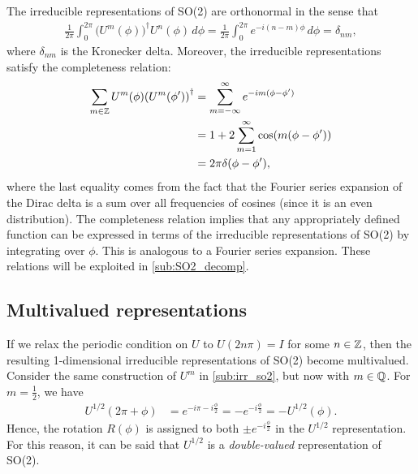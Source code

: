 The irreducible representations of SO(2) are orthonormal in the sense that
\begin{align}
    \frac{1}{2\pi}\int_{0}^{2\pi}{\bigl(U^m(\phi)\bigr)}^\dagger U^n(\phi) \,d\phi = \frac{1}{2\pi}\int_{0}^{2\pi} e^{-i(n-m)\phi} \,d\phi = \delta_{nm},\label{eq:orthogonality}
\end{align}
where $\delta_{nm}$ is the Kronecker delta.
Moreover, the irreducible representations satisfy the completeness relation:
\begin{align}
    \begin{split}    
    \sum_{m\in\mathbb{Z}} U^m(\phi){(U^m(\phi'))}^\dagger 
        &= \sum_{m=-\infty}^\infty e^{-im(\phi-\phi')} \\
        &= 1 + 2\sum_{m=1}^{\infty}\cos(m(\phi-\phi')) \\
        &= 2\pi\delta(\phi-\phi'),
    \end{split}\label{eq:completeness}
\end{align}
where the last equality comes from the fact that the Fourier series expansion of the Dirac delta is a sum over all frequencies of cosines (since it is an even distribution). The completeness relation implies that any appropriately defined function can be expressed in terms of the irreducible representations of SO(2) by integrating over $\phi$. This is analogous to a Fourier series expansion.
These relations will be exploited in \cref{sub:SO2_decomp}.

\subsection{Multivalued representations}\label{sub:multi_so2}
If we relax the periodic condition on $U$ to $U(2n\pi) = I$ for some $n\in\mathbb{Z}$, then the resulting 1-dimensional irreducible representations of SO(2) become multivalued. Consider the same construction of $U^m$ in \cref{sub:irr_so2}, but now with $m\in\mathbb{Q}$. For $m=\frac{1}{2}$, we have
\begin{align}
    U^{1/2}(2\pi + \phi) &= e^{-i\pi - i\frac{\phi}{2}} = -e^{-i\frac{\phi}{2}} = -U^{1/2}(\phi).
\end{align}
Hence, the rotation $R(\phi)$ is assigned to both $\pm e^{-i\frac{\phi}{2}}$ in the $U^{1/2}$ representation. For this reason, it can be said that $U^{1/2}$ is a \textit{double-valued} representation of SO(2).

